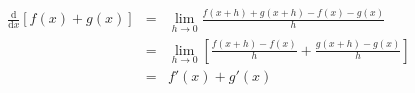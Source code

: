 \documentclass[12pt]{article}
\newcommand{\D}[1]{\ensuremath{\mathrm{d}#1}}
\newcommand{\DDX}{\ensuremath{\frac{\D{}}{\D{x}}}}
\begin{document}
\begin{eqnarray*}
\DDX\left[f(x)+g(x)\right]
& = & \lim_{h\to0}\frac{f(x+h)+g(x+h)-f(x)-g(x)}{h} \\
& = & \lim_{h\to0}\left[\frac{f(x+h)-f(x)}{h}+\frac{g(x+h)-g(x)}{h}\right] \\
& = & f'(x) + g'(x)
\end{eqnarray*}
\end{document}
